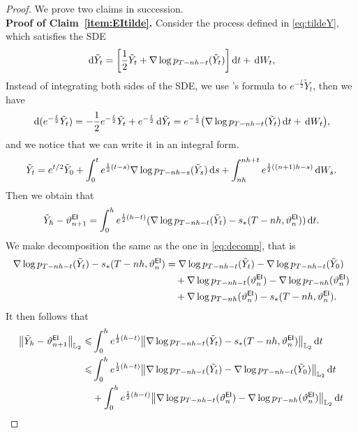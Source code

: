 \begin{proof}
We prove two claims in succession.\\
\textbf{Proof of Claim~\ref{item:EItilde}.} Consider the process defined in \eqref{eq:tildeY}, which satisfies the SDE  
\begin{align*}
    \rmd\tilde{Y}_t=\left[\dfrac{1}{2}\tilde{Y}_t+\nabla\log p_{T-nh-t}(\tilde{Y}_t)\right]\rmd t+\rmd W_t,
\end{align*}
Instead of integrating both sides of the SDE, we use 's formula to $e^{-\frac{t}{2}}\tilde Y_t$, then we have
\begin{align*}
    \rmd (e^{-\frac{t}{2}}\tilde Y_t)=-\dfrac{1}{2}e^{-\frac{t}{2}}\tilde Y_t+e^{-\frac{t}{2}}\rmd \tilde Y_t=e^{-\frac{t}{2}}\left(\nabla\log p_{T-nh-t}(\tilde Y_t)\rmd t+\rmd W_t\right),
\end{align*}
and we notice that we can write it in an integral form.  
\begin{align*}
    \tilde{Y}_t=e^{t/2}\tilde{Y}_0+\int_0^te^{\frac{1}{2}(t-s)}\nabla\log p_{T-nh-s}(\tilde{Y}_{s}){\,\rm d} s+\int_{nh}^{nh+t}e^{\frac{1}{2}((n+1)h-s)}{\,\rm d} W_s.
\end{align*}  
Then we obtain that
\begin{align*}
    \tilde{Y}_h-\vartheta_{n+1}^{\sf EI}=\int_0^he^{\frac{1}{2}(h-t)}(\nabla\log p_{T-nh-t}(\tilde{Y}_t)-s_*(T-nh,\vartheta_n^{\sf EI})){\,\rm d} t.
\end{align*}
We make decomposition the same as the one in \eqref{eq:decomp}, that is
\begin{align*}
    \nabla\log p_{T-nh-t}(\tilde{Y}_t)-s_*(T-nh,\vartheta_n^{\sf EI})
    &= \nabla\log p_{T-nh-t}(\tilde{Y}_t)-\nabla\log p_{T-nh-t}(\tilde{Y}_0)\\
    & \quad +\nabla\log p_{T-nh-t}(\vartheta_n^{\sf EI})-\nabla\log p_{T-nh}(\vartheta_n^{\sf EI})\\
    & \quad +\nabla\log p_{T-nh}(\vartheta_n^{\sf EI})-s_*(T-nh,\vartheta_n^{\sf EI}).
\end{align*}
It then follows that
\begin{align*}
    \l|\tilde{Y}_h-\vartheta_{n+1}^{\sf EI}\r|_{\Ltwo}\leqslant& \int_0^he^{\frac{1}{2}(h-t)}\l|\nabla\log p_{T-nh-t}(\tilde{Y}_t)-s_*(T-nh,\vartheta_n^{\sf EI})\r|_{\Ltwo}\rmd t\\
    \leqslant& \int_0^he^{\frac{1}{2}(h-t)}\l|\nabla\log p_{T-nh-t}(\tilde{Y}_t)-\nabla\log p_{T-nh-t}(\tilde{Y}_0)\r|_{\Ltwo}\rmd t\\
    &+\int_0^he^{\frac{1}{2}(h-t)}\l|\nabla\log p_{T-nh-t}(\vartheta_n^{\sf EI})-\nabla\log p_{T-nh}(\vartheta_n^{\sf EI})\r|_{\Ltwo}\rmd t\\

\end{align*}
\end{proof}
